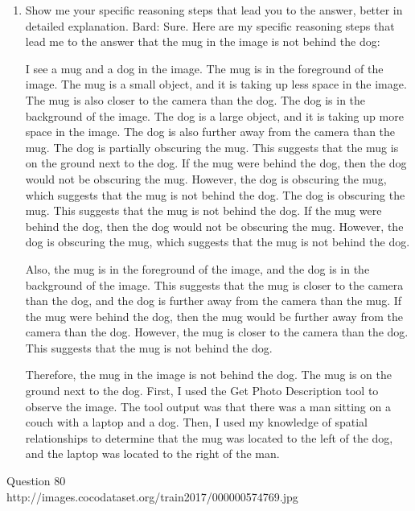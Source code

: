 \begin{enumerate}
    Therefore, the mug in the image is not behind the dog. The mug is on the ground next to the dog.
    \subitem Visual ChatGPT: The laptop is located to the right of the man.
    \item Show me your specific reasoning steps that lead you to the answer, better in detailed explanation.
    \subitem Bard: 
    Sure. Here are my specific reasoning steps that lead me to the answer that the mug in the image is not behind the dog:
    
    I see a mug and a dog in the image.
    The mug is in the foreground of the image. The mug is a small object, and it is taking up less space in the image. The mug is also closer to the camera than the dog.
    The dog is in the background of the image. The dog is a large object, and it is taking up more space in the image. The dog is also further away from the camera than the mug.
    The dog is partially obscuring the mug. This suggests that the mug is on the ground next to the dog.
    If the mug were behind the dog, then the dog would not be obscuring the mug. However, the dog is obscuring the mug, which suggests that the mug is not behind the dog.
    The dog is obscuring the mug. This suggests that the mug is not behind the dog. If the mug were behind the dog, then the dog would not be obscuring the mug. However, the dog is obscuring the mug, which suggests that the mug is not behind the dog.
    
    Also, the mug is in the foreground of the image, and the dog is in the background of the image. This suggests that the mug is closer to the camera than the dog, and the dog is further away from the camera than the mug. If the mug were behind the dog, then the mug would be further away from the camera than the dog. However, the mug is closer to the camera than the dog. This suggests that the mug is not behind the dog.
    
    Therefore, the mug in the image is not behind the dog. The mug is on the ground next to the dog.
    \subitem First, I used the Get Photo Description tool to observe the image. The tool output was that there was a man sitting on a couch with a laptop and a dog. Then, I used my knowledge of spatial relationships to determine that the mug was located to the left of the dog, and the laptop was located to the right of the man.
\end{enumerate}
Question 80\\
http://images.cocodataset.org/train2017/000000574769.jpg
